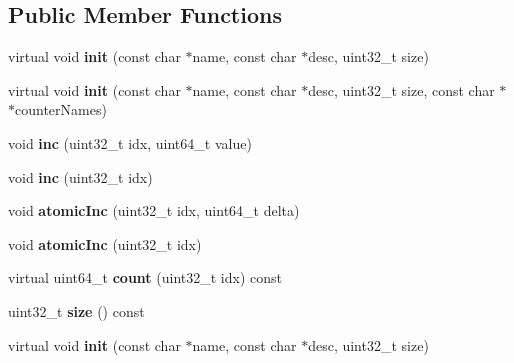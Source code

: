 \subsection*{Public Member Functions}
\begin{DoxyCompactItemize}
\item 
\hypertarget{classVectorCounter_a5124acc06cc12cdd7fcc8eb8cfe6739c}{virtual void {\bfseries init} (const char $\ast$name, const char $\ast$desc, uint32\-\_\-t size)}\label{classVectorCounter_a5124acc06cc12cdd7fcc8eb8cfe6739c}

\item 
\hypertarget{classVectorCounter_a24f4ecb5f982c44f9a3142b486afda46}{virtual void {\bfseries init} (const char $\ast$name, const char $\ast$desc, uint32\-\_\-t size, const char $\ast$$\ast$counter\-Names)}\label{classVectorCounter_a24f4ecb5f982c44f9a3142b486afda46}

\item 
\hypertarget{classVectorCounter_a803d078febd0aa1122b527f2ba418800}{void {\bfseries inc} (uint32\-\_\-t idx, uint64\-\_\-t value)}\label{classVectorCounter_a803d078febd0aa1122b527f2ba418800}

\item 
\hypertarget{classVectorCounter_a89da3b5154d4449bf7e591b420e6a437}{void {\bfseries inc} (uint32\-\_\-t idx)}\label{classVectorCounter_a89da3b5154d4449bf7e591b420e6a437}

\item 
\hypertarget{classVectorCounter_a4ec59076709f0e4f92da09684b430da6}{void {\bfseries atomic\-Inc} (uint32\-\_\-t idx, uint64\-\_\-t delta)}\label{classVectorCounter_a4ec59076709f0e4f92da09684b430da6}

\item 
\hypertarget{classVectorCounter_a5295f20e13bf83736c805cb0c0124cbf}{void {\bfseries atomic\-Inc} (uint32\-\_\-t idx)}\label{classVectorCounter_a5295f20e13bf83736c805cb0c0124cbf}

\item 
\hypertarget{classVectorCounter_a949669fe418060a4ac3a56dd78800b29}{virtual uint64\-\_\-t {\bfseries count} (uint32\-\_\-t idx) const }\label{classVectorCounter_a949669fe418060a4ac3a56dd78800b29}

\item 
\hypertarget{classVectorCounter_a95f7a0570dc7a6eafeb85cece275d069}{uint32\-\_\-t {\bfseries size} () const }\label{classVectorCounter_a95f7a0570dc7a6eafeb85cece275d069}

\item 
\hypertarget{classVectorCounter_a5124acc06cc12cdd7fcc8eb8cfe6739c}{virtual void {\bfseries init} (const char $\ast$name, const char $\ast$desc, uint32\-\_\-t size)}\label{classVectorCounter_a5124acc06cc12cdd7fcc8eb8cfe6739c}


\end{DoxyCompactItemize}
